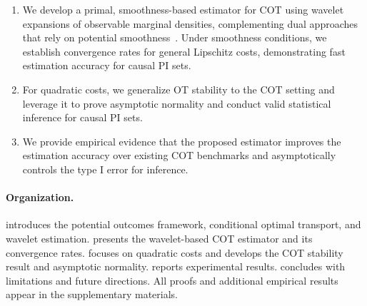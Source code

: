 \documentclass{article}
\theoremstyle{plain}
\theoremstyle{definition}
\theoremstyle{plain}
\begin{document}
    \begin{enumerate}
        \item We develop a primal, smoothness-based estimator for COT using wavelet expansions of observable marginal densities, complementing dual approaches that rely on potential smoothness~\parencite{ji2023model,al2025error}. Under smoothness conditions, we establish convergence rates for general Lipschitz costs, demonstrating fast estimation accuracy for causal PI sets.
 
        \item For quadratic costs, we generalize OT stability to the COT setting and leverage it to prove asymptotic normality and conduct valid statistical inference for causal PI sets. 
        \item We provide empirical evidence that the proposed estimator improves the estimation accuracy over existing COT benchmarks and asymptotically controls the type I error for inference.
    \end{enumerate}

\paragraph{Organization.}
 introduces the potential outcomes framework, conditional optimal transport, and wavelet estimation. 
 presents the wavelet-based COT estimator and its convergence rates. 
 focuses on quadratic costs and develops the COT stability result and asymptotic normality. 
 reports experimental results. 
 concludes with limitations and future directions. 
All proofs and additional empirical results appear in the supplementary materials.
\end{document}
